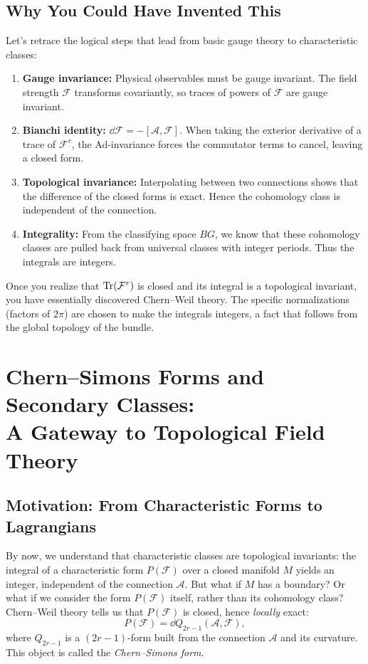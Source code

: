 \documentclass[11pt]{article}
\newcommand{\cA}{\mathcal{A}}
\newcommand{\cF}{\mathcal{F}}
\begin{document}
\subsection{Why You Could Have Invented This}
Let's retrace the logical steps that lead from basic gauge theory to characteristic classes:
\begin{enumerate}
    \item \textbf{Gauge invariance:} Physical observables must be gauge invariant. The field strength \(\cF\) transforms covariantly, so traces of powers of \(\cF\) are gauge invariant.
    \item \textbf{Bianchi identity:} \(\dd\cF = -[\cA,\cF]\). When taking the exterior derivative of a trace of \(\cF^r\), the Ad-invariance forces the commutator terms to cancel, leaving a closed form.
    \item \textbf{Topological invariance:} Interpolating between two connections shows that the difference of the closed forms is exact. Hence the cohomology class is independent of the connection.
    \item \textbf{Integrality:} From the classifying space \(BG\), we know that these cohomology classes are pulled back from universal classes with integer periods. Thus the integrals are integers.
\end{enumerate}
Once you realize that \(\Tr(\cF^r)\) is closed and its integral is a topological invariant, you have essentially discovered Chern--Weil theory. The specific normalizations (factors of \(2\pi\)) are chosen to make the integrals integers, a fact that follows from the global topology of the bundle.
\section{Chern--Simons Forms and Secondary Classes: \\ A Gateway to Topological Field Theory}
\label{sec:cs}

\subsection{Motivation: From Characteristic Forms to Lagrangians}
By now, we understand that characteristic classes are topological invariants: the integral of a characteristic form \(P(\cF)\) over a closed manifold \(M\) yields an integer, independent of the connection \(\cA\). But what if \(M\) has a boundary? Or what if we consider the form \(P(\cF)\) itself, rather than its cohomology class? Chern--Weil theory tells us that \(P(\cF)\) is closed, hence \emph{locally} exact:
\[
P(\cF) = \dd Q_{2r-1}(\cA,\cF),
\]
where \(Q_{2r-1}\) is a \((2r-1)\)-form built from the connection \(\cA\) and its curvature. This object is called the \emph{Chern--Simons form}. 
\end{document}
